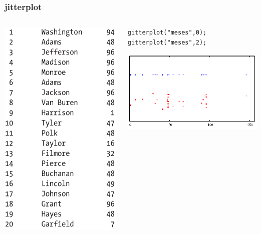 \documentclass{beamer}
\begin{document}
\begin{frame}[fragile]
\frametitle{jitterplot}
\begin{columns}
\begin{column}{0.3\textwidth}
\includegraphics[scale=0.2]{jittertable}
\end{column}
\begin{column}{0.7\textwidth}
\begin{center}
\begin{lstlisting}
gitterplot("meses",0);
gitterplot("meses",2);
\end{lstlisting}
\end{center}
\includegraphics[scale=0.5]{jitterplot}
\end{column}
\end{columns}
\end{frame}
\end{document}
